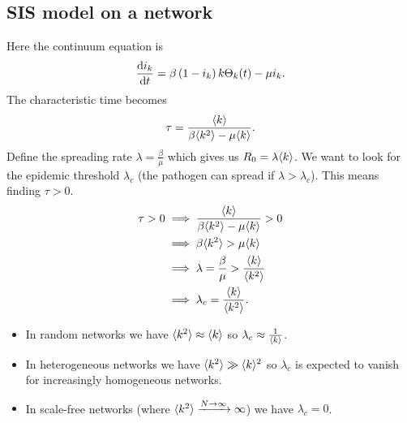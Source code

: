 \documentclass[a4paper,9pt]{extarticle}
\begin{document}
\begin{multicols*}{2}
	\subsection{SIS model on a network}
	Here the continuum equation is
	\begin{equation*}
		\frac{\mathrm{d} i_{k}}{\mathrm{d} t}=\beta\left(1-i_{k}\right)k\Theta_{k}(t)-\mu i_{k}.
	\end{equation*}
	The characteristic time becomes
	\begin{equation*}
		\tau=\frac{\langle k \rangle}{\beta\langle k^{2} \rangle-\mu\langle k \rangle}.
	\end{equation*}
	Define the spreading rate $\lambda=\frac{\beta}{\mu}$ which gives us $R_{0}=\lambda\langle k \rangle$. We want to look for the epidemic threshold $\lambda_{c}$ (the pathogen can spread if $\lambda>\lambda_{c}$). This means finding $\tau>0$.
	\begin{align*}
		\tau>0&\implies\frac{\langle k \rangle}{\beta\langle k^{2} \rangle-\mu\langle k \rangle}>0\\
		&\implies \beta\langle k^{2} \rangle>\mu\langle k \rangle\\
		&\implies\lambda=\frac{\beta}{\mu}>\frac{\langle k \rangle}{\langle k^{2} \rangle}\\
		&\implies\lambda_{c}=\frac{\langle k \rangle}{\langle k^{2} \rangle}.
	\end{align*}
	\begin{itemize}
		\item In random networks we have $\langle k^{2} \rangle\approx\langle k \rangle$ so $\lambda_{c}\approx\frac{1}{\langle k \rangle}$.
		\item In heterogeneous networks we have $\langle k^{2} \rangle\gg\langle k \rangle^{2}$ so $\lambda_{c}$ is expected to vanish for increasingly homogeneous networks.
		\item In scale-free networks (where $\langle k^{2} \rangle\xrightarrow{N\to\infty}\infty$) we have $\lambda_{c}=0$.
	\end{itemize}

\end{multicols*}
\end{document}
